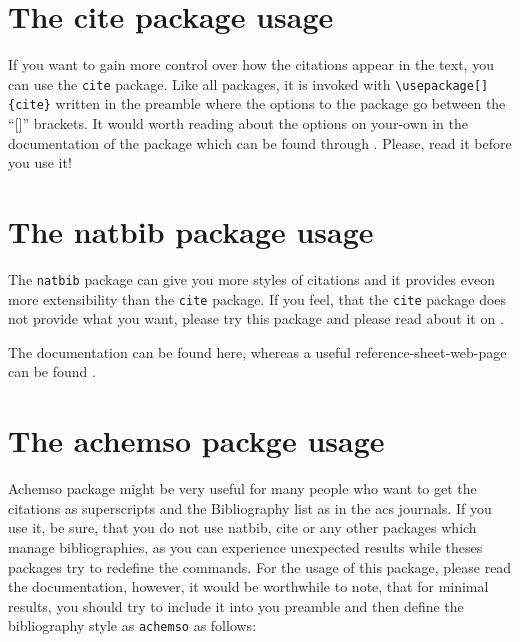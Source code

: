 {{\section{The cite package usage}

If you want to gain more control over how the citations appear in the text, you
can use the \verb|cite| package. Like all packages, it is invoked with
\verb|\usepackage[]{cite}| written in the preamble where the options to the
package go between the ``[]'' brackets. It would worth reading about the options
on your-own in the documentation of the package which can be found through
. Please, read it before you use it!

\section{The natbib package usage}

The \verb|natbib| package can give you more styles of citations and it provides
eveon more extensibility than the \verb|cite| package. If you feel, that the
\verb|cite| package does not provide what you want, please try this package and
please read about it on
.

The documentation can be found
{here}, whereas a useful reference-sheet-web-page can be found
.

\section{The achemso packge usage}

Achemso package might be very useful for many people who want to get the
citations as superscripts and the Bibliography list as in the \ac{acs} journals.
If you use it, be sure, that you do not use natbib, cite or any other packages
which manage bibliographies, as you can experience unexpected results while
theses packages try to redefine the commands.
For the usage of this package, please read the 
{documentation},
however, it would be worthwhile to note, that for minimal results, you should
try to include it into you preamble and then define the bibliography style as
\verb|achemso| as follows:


}}
